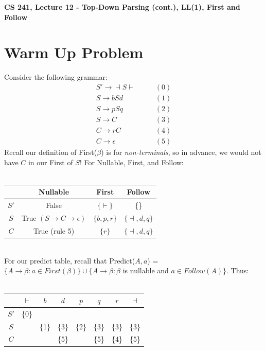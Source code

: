 \documentclass[12pt]{article}
\author{Clement Tsang}
\begin{document}
\begin{center}
    \Large\textbf{CS 241, Lecture 12 - Top-Down Parsing (cont.), LL(1), First and Follow}
\end{center}

\section{Warm Up Problem}
Consider the following grammar:
\begin{align*}
    S' \rightarrow \dashv S \vdash \qquad &(0)\\
    S \rightarrow bSd \qquad &(1)\\
    S \rightarrow pSq \qquad &(2)\\
    S \rightarrow C \qquad &(3)\\
    C \rightarrow rC \qquad &(4)\\
    C \rightarrow \epsilon \qquad &(5)
\end{align*}
Recall our definition of First($\beta$) is for \emph{non-terminals}, so in advance, we would not have $C$ in our First of $S$!  For Nullable, First, and Follow:\\\quad\\
\begin{tabular}{c||c|c|c}
    & Nullable & First & Follow \\
    \hline
    $S'$ & False & $\{\vdash\}$ & \{\} \\
    $S$ & True $(S \rightarrow C \rightarrow \epsilon)$ & $\{b, p, r\}$ & $\{\dashv, d, q\}$\\
    $C$ & True (rule 5) & $\{r\}$ & $\{\dashv, d, q\}$\\
\end{tabular}\\

\noindent For our predict table, recall that Predict($A, a$) = $\{A \rightarrow \beta: a \in First(\beta)\} \cup \{A \rightarrow \beta : \beta$ is nullable and $a \in Follow(A)\}$.  Thus:\\
\quad\\
\begin{tabular}{c||ccccccc}
    & $\vdash$ & $b$ & $d$ & $p$ & $q$ & $r$ & $\dashv$\\
    \hline
    $S'$ & \{0\}\\
    $S$ & & \{1\} & \{3\} & \{2\} & \{3\} & \{3\} & \{3\}\\
    $C$ & & & \{5\} & & \{5\} & \{4\} & \{5\}\\
\end{tabular}\\
\end{document}
